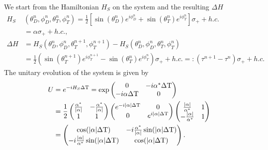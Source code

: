 We start from the Hamiltonian $H_S$ on the system and the resulting $\Delta H$
\begin{align}
	H_S&(\theta_D^n, \phi_D^n, \theta_T^n, \phi_T^n) = \frac{1}{2} \left[\sin(\theta_D^n) e^{i\phi_D^n} + \sin(\theta_T^n) e^{i\phi_T^n}\right] \sigma_{+} + h.c. \nonumber \\
	& = \alpha \sigma_{+} + h.c., \nonumber \\
	\Delta H & = H_S(\theta_D^n, \phi_D^n, \theta_T^{n+1}, \phi_T^{n+1}) - H_S(\theta_D^n, \phi_D^n, \theta_T^n, \phi_T^n) \nonumber \\
	& = \frac{1}{2}(\sin(\theta_T^{n+1})e^{i\phi_T^{n+1}} - \sin(\theta_T^n)e^{i\phi_T^n}) \sigma_{+} + h.c. =: (\tau^{n+1} - \tau^n) \sigma_{+} + h.c. \nonumber
\end{align}
The unitary evolution of the system is given by
\begin{align}
	U & = e^{-iH_S \Delta \mathrm{T}} = 
	\exp \begin{pmatrix}
	0 & -i\alpha^* \Delta \mathrm{T} \\
	-i \alpha \Delta \mathrm{T} & 0 \\
	\end{pmatrix} \nonumber \\
	& = 
	\frac{1}{2} \begin{pmatrix}
	\frac{\alpha^*}{\abs{\alpha}} & -\frac{\alpha^*}{\abs{\alpha}} \\
	1 & 1 \\
	\end{pmatrix}
	\begin{pmatrix}
	e^{-i\abs{\alpha} \Delta \mathrm{T}} & 0 \\
	0 & e^{i\abs{\alpha} \Delta \mathrm{T}} \\
	\end{pmatrix}
	\begin{pmatrix}
	\frac{\abs{\alpha}}{\alpha^*} & 1 \\
	-\frac{\abs{\alpha}}{\alpha^*} & 1 \\
	\end{pmatrix} \nonumber \\
	& = \begin{pmatrix}
	\cos(\abs{\alpha}\Delta \mathrm{T}) & -i\frac{\alpha^*}{\abs{\alpha}} \sin(\abs{\alpha}\Delta \mathrm{T}) \\
	-i\frac{\abs{\alpha}}{\alpha^*} \sin(\abs{\alpha}\Delta \mathrm{T}) & \cos(\abs{\alpha} \Delta \mathrm{T}) \\
	\end{pmatrix}. \nonumber
\end{align}
